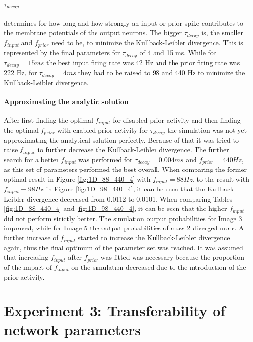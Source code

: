 \paragraph{$\tau_{decay}$} determines for how long and how strongly an input or prior spike contributes to the membrane potentials of the output neurons. The bigger $\tau_{decay}$ is, the smaller $f_{input}$ and $f_{prior}$ need to be, to minimize the Kullback-Leibler divergence. This is represented by the final parameters for $\tau_{decay}$ of 4 and 15 ms. While for $\tau_{decay} = 15 ms$ the best input firing rate was 42 Hz and the prior firing rate was 222 Hz, for $\tau_{decay} = 4 ms$ they had to be raised to 98 and 440 Hz to minimize the Kullback-Leibler divergence.

\paragraph{Approximating the analytic solution}
After first finding the optimal $f_{input}$ for disabled prior activity and then finding the optimal $f_{prior}$ with enabled prior activity for $\tau_{decay}$ the simulation was not yet approximating the analytical solution perfectly. Because of that it was tried to raise $f_{input}$ to further decrease the Kullback-Leibler divergence. The further search for a better $f_{input}$ was performed for $\tau_{decay} = 0.004 ms$ and $f_{prior} = 440 Hz$, as this set of parameters performed the best overall.
When comparing the former optimal result in Figure \ref{fig:1D_88_440_4} with $f_{input} = 88 Hz$, to the result with $f_{input} = 98 Hz$ in Figure \ref{fig:1D_98_440_4}, it can be seen that the Kullback-Leibler divergence decreased from 0.0112 to 0.0101. When comparing Tables \ref{fig:1D_88_440_4} and \ref{fig:1D_98_440_4}, it can be seen that the higher $f_{input}$ did not perform strictly better. The simulation output probabilities for Image 3 improved, while for Image 5 the output probabilities of class 2 diverged more. A further increase of $f_{input}$ started to increase the Kullback-Leibler divergence again, thus the final optimum of the parameter set was reached. It was assumed that increasing $f_{input}$ after $f_{prior}$ was fitted was necessary because the proportion of the impact of $f_{input}$ on the simulation decreased due to the introduction of the prior activity.

\section{Experiment 3: Transferability of network parameters}
\label{section:1DDoubleSize}

